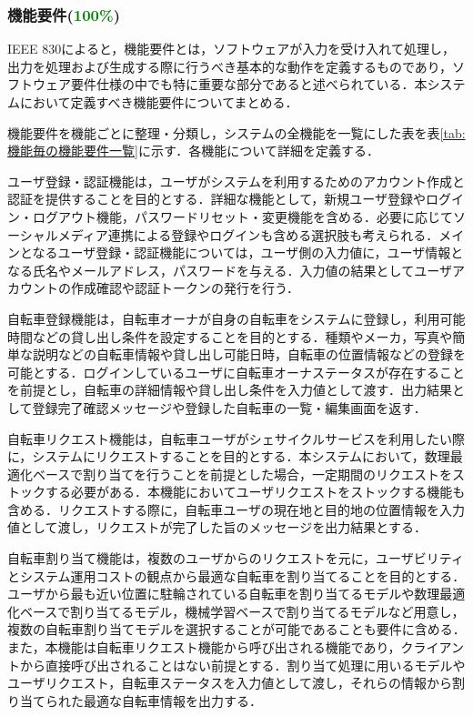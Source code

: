       \subsubsection{機能要件(\textcolor{green}{100\%})}
        \label{sec:機能要件}
          \par IEEE 830によると，機能要件とは，ソフトウェアが入力を受け入れて処理し，出力を処理および生成する際に行うべき基本的な動作を定義するものであり，ソフトウェア要件仕様の中でも特に重要な部分であると述べられている．本システムにおいて定義すべき機能要件についてまとめる．
          \par 機能要件を機能ごとに整理・分類し，システムの全機能を一覧にした表を表\ref{tab:機能毎の機能要件一覧}に示す．各機能について詳細を定義する．
          \par ユーザ登録・認証機能は，ユーザがシステムを利用するためのアカウント作成と認証を提供することを目的とする．詳細な機能として，新規ユーザ登録やログイン・ログアウト機能，パスワードリセット・変更機能を含める．必要に応じてソーシャルメディア連携による登録やログインも含める選択肢も考えられる．メインとなるユーザ登録・認証機能については，ユーザ側の入力値に，ユーザ情報となる氏名やメールアドレス，パスワードを与える．入力値の結果としてユーザアカウントの作成確認や認証トークンの発行を行う．
          \par 自転車登録機能は，自転車オーナが自身の自転車をシステムに登録し，利用可能時間などの貸し出し条件を設定することを目的とする．種類やメーカ，写真や簡単な説明などの自転車情報や貸し出し可能日時，自転車の位置情報などの登録を可能とする．ログインしているユーザに自転車オーナステータスが存在することを前提とし，自転車の詳細情報や貸し出し条件を入力値として渡す．出力結果として登録完了確認メッセージや登録した自転車の一覧・編集画面を返す．
          \par 自転車リクエスト機能は，自転車ユーザがシェサイクルサービスを利用したい際に，システムにリクエストすることを目的とする．本システムにおいて，数理最適化ベースで割り当てを行うことを前提とした場合，一定期間のリクエストをストックする必要がある．本機能においてユーザリクエストをストックする機能も含める．リクエストする際に，自転車ユーザの現在地と目的地の位置情報を入力値として渡し，リクエストが完了した旨のメッセージを出力結果とする．
          \par 自転車割り当て機能は，複数のユーザからのリクエストを元に，ユーザビリティとシステム運用コストの観点から最適な自転車を割り当てることを目的とする．ユーザから最も近い位置に駐輪されている自転車を割り当てるモデルや数理最適化ベースで割り当てるモデル，機械学習ベースで割り当てるモデルなど用意し，複数の自転車割り当てモデルを選択することが可能であることも要件に含める．また，本機能は自転車リクエスト機能から呼び出される機能であり，クライアントから直接呼び出されることはない前提とする．割り当て処理に用いるモデルやユーザリクエスト，自転車ステータスを入力値として渡し，それらの情報から割り当てられた最適な自転車情報を出力する．
